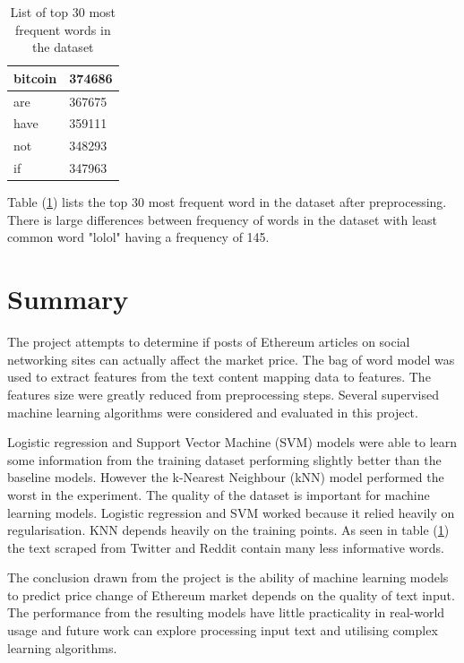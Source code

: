 \documentclass[transmag]{IEEEtran}
\begin{document}
\begin{table}[h]
\begin{center}
\begin{tabular}{|l|l|}
bitcoin                             & 374686                                  \\ \hline
are                                 & 367675                                  \\ \hline
have                                & 359111                                  \\ \hline
not                                 & 348293                                  \\ \hline
if                                  & 347963                                  \\ \hline
\end{tabular}
\end{center}
\caption{List of top 30 most frequent words in the dataset}
    \label{tab:top30words}
\end{table}

\noindent Table (\ref{tab:top30words}) lists the top 30 most frequent word in the dataset after preprocessing. There is large differences between frequency of words in the dataset with least common word "lolol" having a frequency of 145.




\section{Summary}

\noindent The project attempts to determine if posts of Ethereum articles on social networking sites can actually affect the market price. The bag of word model was used to extract features from the text content mapping data to features. The features size were greatly reduced from preprocessing steps. Several supervised machine learning algorithms were considered and evaluated in this project.

\noindent Logistic regression and Support Vector Machine (SVM) models were able to learn some information from the training dataset performing slightly better than the baseline models. However the k-Nearest Neighbour (kNN) model performed the worst in the experiment. The quality of the dataset is important for machine learning models. Logistic regression and SVM worked because it relied heavily on regularisation. KNN depends heavily on the training points. As seen in table (\ref{tab:top30words}) the text scraped from Twitter and Reddit contain many less informative words.

\noindent The conclusion drawn from the project is the ability of machine learning models to predict price change of Ethereum market depends on the quality of text input. The performance from the resulting models have little practicality in real-world usage and future work can explore processing input text and utilising complex learning algorithms.
\end{document}
